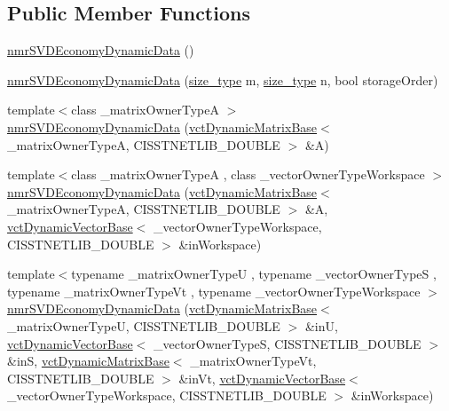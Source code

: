 \subsection*{Public Member Functions}
\begin{DoxyCompactItemize}
\item 
\hyperlink{classnmr_s_v_d_economy_dynamic_data_a3ec533053ba90b32f4d40b88ca192ef4}{nmr\-S\-V\-D\-Economy\-Dynamic\-Data} ()
\item 
\hyperlink{classnmr_s_v_d_economy_dynamic_data_a422ea4d9f2498e3314d26941c5893562}{nmr\-S\-V\-D\-Economy\-Dynamic\-Data} (\hyperlink{classnmr_s_v_d_economy_dynamic_data_aee8ff15f2e92af24fdc3c7f5908770f3}{size\-\_\-type} m, \hyperlink{classnmr_s_v_d_economy_dynamic_data_aee8ff15f2e92af24fdc3c7f5908770f3}{size\-\_\-type} n, bool storage\-Order)
\item 
{\footnotesize template$<$class \-\_\-matrix\-Owner\-Type\-A $>$ }\\\hyperlink{classnmr_s_v_d_economy_dynamic_data_ac2d9d5859f101957ee27a211c96ce8f8}{nmr\-S\-V\-D\-Economy\-Dynamic\-Data} (\hyperlink{classvct_dynamic_matrix_base}{vct\-Dynamic\-Matrix\-Base}$<$ \-\_\-matrix\-Owner\-Type\-A, C\-I\-S\-S\-T\-N\-E\-T\-L\-I\-B\-\_\-\-D\-O\-U\-B\-L\-E $>$ \&A)
\item 
{\footnotesize template$<$class \-\_\-matrix\-Owner\-Type\-A , class \-\_\-vector\-Owner\-Type\-Workspace $>$ }\\\hyperlink{classnmr_s_v_d_economy_dynamic_data_af81cb8af63fc50d52ff432281712e455}{nmr\-S\-V\-D\-Economy\-Dynamic\-Data} (\hyperlink{classvct_dynamic_matrix_base}{vct\-Dynamic\-Matrix\-Base}$<$ \-\_\-matrix\-Owner\-Type\-A, C\-I\-S\-S\-T\-N\-E\-T\-L\-I\-B\-\_\-\-D\-O\-U\-B\-L\-E $>$ \&A, \hyperlink{classvct_dynamic_vector_base}{vct\-Dynamic\-Vector\-Base}$<$ \-\_\-vector\-Owner\-Type\-Workspace, C\-I\-S\-S\-T\-N\-E\-T\-L\-I\-B\-\_\-\-D\-O\-U\-B\-L\-E $>$ \&in\-Workspace)
\item 
{\footnotesize template$<$typename \-\_\-matrix\-Owner\-Type\-U , typename \-\_\-vector\-Owner\-Type\-S , typename \-\_\-matrix\-Owner\-Type\-Vt , typename \-\_\-vector\-Owner\-Type\-Workspace $>$ }\\\hyperlink{classnmr_s_v_d_economy_dynamic_data_a700f9ed63cd971cd30c5e9f2b982e4b8}{nmr\-S\-V\-D\-Economy\-Dynamic\-Data} (\hyperlink{classvct_dynamic_matrix_base}{vct\-Dynamic\-Matrix\-Base}$<$ \-\_\-matrix\-Owner\-Type\-U, C\-I\-S\-S\-T\-N\-E\-T\-L\-I\-B\-\_\-\-D\-O\-U\-B\-L\-E $>$ \&in\-U, \hyperlink{classvct_dynamic_vector_base}{vct\-Dynamic\-Vector\-Base}$<$ \-\_\-vector\-Owner\-Type\-S, C\-I\-S\-S\-T\-N\-E\-T\-L\-I\-B\-\_\-\-D\-O\-U\-B\-L\-E $>$ \&in\-S, \hyperlink{classvct_dynamic_matrix_base}{vct\-Dynamic\-Matrix\-Base}$<$ \-\_\-matrix\-Owner\-Type\-Vt, C\-I\-S\-S\-T\-N\-E\-T\-L\-I\-B\-\_\-\-D\-O\-U\-B\-L\-E $>$ \&in\-Vt, \hyperlink{classvct_dynamic_vector_base}{vct\-Dynamic\-Vector\-Base}$<$ \-\_\-vector\-Owner\-Type\-Workspace, C\-I\-S\-S\-T\-N\-E\-T\-L\-I\-B\-\_\-\-D\-O\-U\-B\-L\-E $>$ \&in\-Workspace)

\end{DoxyCompactItemize}
